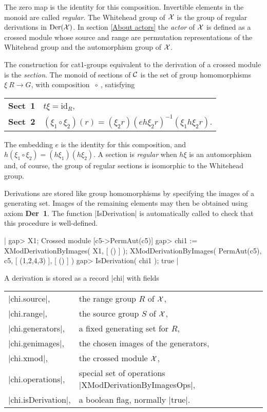 \noindent
The  zero   map  is the identity  for    this composition.  Invertible
elements in the monoid are called  {\em regular}.  The Whitehead group
of ${\cal  X}$ is the  group of regular derivations in $\rm{Der}({\cal
X} )$.  In section \ref{About actors} the {\em actor} of ${\cal X}$ is
defined  as a crossed  module whose  source and  range are permutation
representations of the Whitehead group  and the automorphism group  of
${\cal X}$.

The  construction for  cat1-groups  equivalent to the  derivation of a
crossed module is the {\em section}.  The monoid of sections of ${\cal
C}$  is  the  set of   group homomorphisms   $\xi \: R   \to  G$, with
composition $\ \circ \ $, satisfying\:
\begin{center}
\begin{tabular}{l l}
\textbf{Sect\ 1\:}  &  $t \xi = \mathrm{id}_R$,               \\
\textbf{Sect\ 2\:}  &  $(\xi_1 \circ \xi_2)(r) =
                       (\xi_{2}r)(e h \xi_{2}r)^{-1}(\xi_{1} h \xi_{2}r)$.
\end{tabular}
\end{center}
The embedding  $e$ is the identity for  this composition, and $h(\xi_1
\circ  \xi_2) = (h \xi_1)(h \xi_2)$.   A section is {\em regular} when
$h   \xi$  is an automorphism and,   of  course, the group  of regular
sections is isomorphic to the Whitehead group.

Derivations  are  stored  like group homomorphisms  by  specifying the
images of a generating set.  Images of the remaining elements may then
be obtained using  axiom \textbf{Der\ 1}.  The function |IsDerivation|
is automatically called to check that this procedure is well-defined.

|    gap> X1;
    Crossed module [c5->PermAut(c5)]
    gap> chi1 := XModDerivationByImages( X1, [ () ] );
    XModDerivationByImages( PermAut(c5), c5, [ (1,2,4,3) ], [ () ] )
    gap> IsDerivation( chi1 );
    true  |

A derivation is stored as a record |chi| with fields\:

\begin{tabular}{ll}
|chi.source|,      & the range group $R$ of ${\cal X}$,         \\
|chi.range|,       & the source group $S$ of ${\cal X}$,        \\
|chi.generators|,  & a fixed generating set for $R$,            \\
|chi.genimages|,   & the chosen images of the generators,       \\
|chi.xmod|,        & the crossed module ${\cal X}$,             \\
|chi.operations|,  & special set of operations |XModDerivationByImagesOps|, \\
|chi.isDerivation|,& a boolean flag, normally |true|.
\end{tabular}

